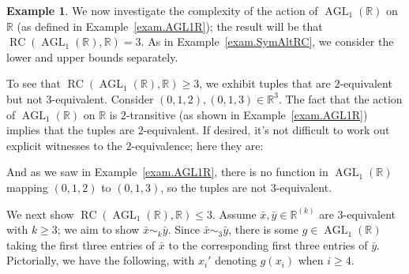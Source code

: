 \documentclass[11pt]{amsart}
\theoremstyle{plain}
\theoremstyle{definition}
\newtheorem{example}{Example}
\theoremstyle{remark}
\DeclareMathOperator{\AGL}{AGL}
\DeclareMathOperator{\rc}{RC}
\begin{document}
\begin{example}\label{exam.AGL1RC}
We now investigate the complexity of the action of $\AGL_1(\mathbb{R})$  on $\mathbb{R}$ (as defined in Example~\ref{exam.AGL1R}); the result will be that $\rc(\AGL_1(\mathbb{R}),\mathbb{R})= 3$.  As in Example~\ref{exam.SymAltRC}, we consider the lower and upper bounds separately. 

To see that $\rc(\AGL_1(\mathbb{R}),\mathbb{R})\ge 3$, we exhibit tuples that are $2$-equivalent but not $3$-equivalent. Consider $(0,1,2),(0,1,3) \in \mathbb{R}^3$. The fact that the action of $\AGL_1(\mathbb{R})$  on $\mathbb{R}$ is $2$-transitive (as shown in Example~\ref{exam.AGL1R}) implies that the tuples are $2$-equivalent. If desired, it's not difficult to work out explicit witnesses to the $2$-equivalence; here they are:  
\begin{center}
\end{center}
And as we saw in  Example~\ref{exam.AGL1R}, there is no function in $\AGL_1(\mathbb{R})$ mapping $(0,1,2)$ to $(0,1,3)$, so the tuples are not $3$-equivalent.

We next show $\rc(\AGL_1(\mathbb{R}),\mathbb{R})\le 3$. Assume $\bar{x},\bar{y} \in \mathbb{R}^{(k)}$ are $3$-equivalent with $k\ge 3$; we aim to show $\bar{x}\sim_k\bar{y}$. Since  $\bar{x}\sim_3\bar{y}$, there is some $g \in \AGL_1(\mathbb{R})$ taking the first three entries of $\bar{x}$ to the corresponding first three entries of $\bar{y}$. Pictorially, we have the following, with $x_i'$ denoting $g(x_i)$ when $i\ge 4$.
\begin{center}
\end{center}
\end{example}
\end{document}
